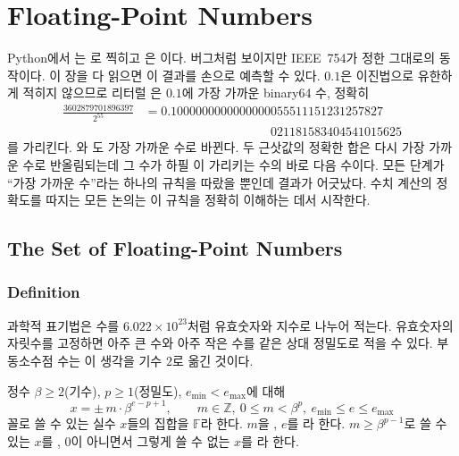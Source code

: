 \chapter{Floating-Point Numbers}
\label{ch:floating-point}


Python에서 는 로 찍히고 은 이다. 버그처럼 보이지만 IEEE~754가 정한 그대로의 동작이다. 이 장을 다 읽으면 이 결과를 손으로 예측할 수 있다. $0.1$은 이진법으로 유한하게 적히지 않으므로 리터럴 은 $0.1$에 가장 가까운 binary64 수, 정확히
\[
\begin{aligned}
\frac{3602879701896397}{2^{55}}&=0.1000000000000000055511151231257827\\
&\phantom{{}=0.1000000000000000}021181583404541015625
\end{aligned}
\]
를 가리킨다. 와 도 가장 가까운 수로 바뀐다. 두 근삿값의 정확한 합은 다시 가장 가까운 수로 반올림되는데 그 수가 하필 이 가리키는 수의 바로 다음 수이다. 모든 단계가 ``가장 가까운 수''라는 하나의 규칙을 따랐을 뿐인데 결과가 어긋났다. 수치 계산의 정확도를 따지는 모든 논의는 이 규칙을 정확히 이해하는 데서 시작한다.

\section{The Set of Floating-Point Numbers}
\label{sec:fp-set}

\subsection{Definition}

과학적 표기법은 수를 $6.022\times10^{23}$처럼 유효숫자와 지수로 나누어 적는다. 유효숫자의 자릿수를 고정하면 아주 큰 수와 아주 작은 수를 같은 상대 정밀도로 적을 수 있다. 부동소수점 수는 이 생각을 기수 $2$로 옮긴 것이다.

\begin{definition}[부동소수점 수]
\label{def:fp-set}
정수 $\beta\ge2$(기수), $p\ge1$(정밀도), $e_{\min}<e_{\max}$에 대해
\[
x=\pm\,m\cdot\beta^{e-p+1},\qquad m\in\mathbb Z,\ 0\le m<\beta^p,\ e_{\min}\le e\le e_{\max}
\]
꼴로 쓸 수 있는 실수 $x$들의 집합을 $\mathbb F$라 한다. $m$을 , $e$를 라 한다. $m\ge\beta^{p-1}$로 쓸 수 있는 $x$를 , $0$이 아니면서 그렇게 쓸 수 없는 $x$를 라 한다.
\end{definition}


